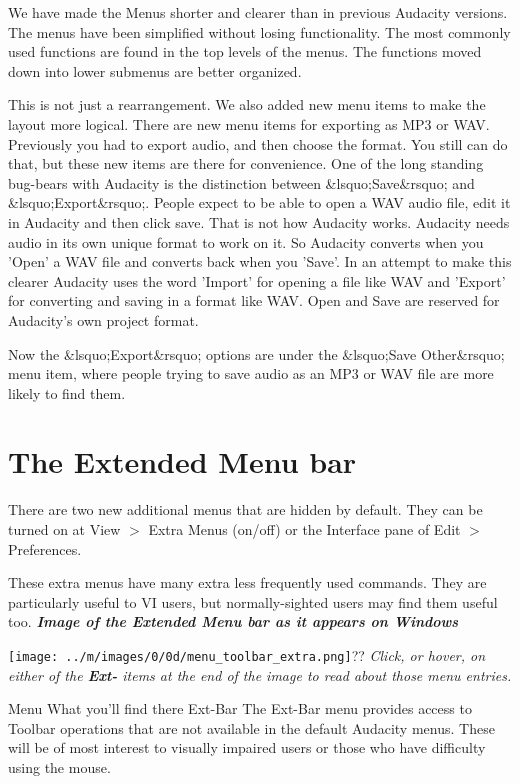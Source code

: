 \documentclass[twocolumn]{book}
\begin{document}
We have made the Menus shorter and clearer than in previous Audacity versions. The menus have been simplified without losing functionality. The most commonly used functions are found in the top levels of the menus. The functions moved down into lower submenus are better organized.

This is not just a rearrangement.  We also added new menu items to make the layout more logical.  There are new menu items for exporting as MP3 or WAV. Previously you had to export audio, and then choose the format. You still can do that, but these new items are there for convenience.
One of the long standing bug-bears with Audacity is the distinction between \&lsquo;Save\&rsquo; and \&lsquo;Export\&rsquo;. People expect to be able to open a WAV audio file, edit it in Audacity and then click save. That is not how Audacity works. Audacity needs audio in its own unique format to work on it. So Audacity converts when you 'Open' a WAV file and converts back when you 'Save'. In an attempt to make this clearer Audacity uses the word 'Import' for opening a file like WAV and 'Export' for converting and saving in a format like WAV. Open and Save are reserved for Audacity's own project format.

Now the \&lsquo;Export\&rsquo; options are under the \&lsquo;Save Other\&rsquo; menu item, where people trying to save audio as an MP3 or WAV file are more likely to find them. 



\section{The Extended Menu bar}


There are two new additional menus that are hidden by default.  They can be turned on at View \mbox{$>$} Extra Menus (on/off) or the Interface pane of Edit \mbox{$>$} Preferences.

These extra menus have many extra less frequently used commands.  They are particularly useful to VI users, but normally-sighted users may find them useful too.
\textit{\textbf{Image of the Extended Menu bar as it appears on Windows}}\par\texttt{[image: ../m/images/0/0d/menu\_toolbar\_extra.png]}??
\textit{Click, or hover, on either of the \textbf{Ext-} items at the end of the image to read about those menu entries.}

Menu
What you'll find there
Ext-Bar
The Ext-Bar menu provides access to Toolbar operations that are not available in the default Audacity menus. These will be of most interest to visually impaired users or those who have difficulty using the mouse.
\end{document}

